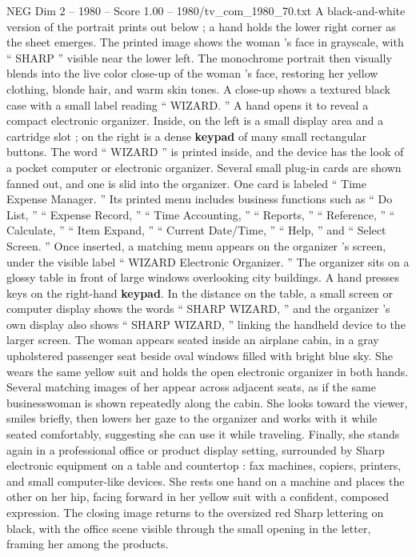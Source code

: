 \begin{textsample}{NEG Dim 2 – 1980 – Score 1.00 – 1980/tv\_com\_1980\_70.txt}
A black-and-white version of the portrait prints out below ; a hand holds the lower right corner as the sheet emerges.
The printed image shows the woman ’s face in grayscale, with “ SHARP ” visible near the lower left.
The monochrome portrait then visually blends into the live color close-up of the woman ’s face, restoring her yellow clothing, blonde hair, and warm skin tones.
A close-up shows a textured black case with a small label reading “ WIZARD. ” A hand opens it to reveal a compact electronic organizer.
Inside, on the left is a small display area and a cartridge slot ; on the right is a dense \textbf{keypad} of many small rectangular buttons.
The word “ WIZARD ” is printed inside, and the device has the look of a pocket computer or electronic organizer.
Several small plug-in cards are shown fanned out, and one is slid into the organizer.
One card is labeled “ Time Expense Manager. ” Its printed menu includes business functions such as “ Do List, ” “ Expense Record, ” “ Time Accounting, ” “ Reports, ” “ Reference, ” “ Calculate, ” “ Item Expand, ” “ Current Date/Time, ” “ Help, ” and “ Select Screen. ” Once inserted, a matching menu appears on the organizer ’s screen, under the visible label “ WIZARD Electronic Organizer. ” The organizer sits on a glossy table in front of large windows overlooking city buildings.
A hand presses keys on the right-hand \textbf{keypad}.
In the distance on the table, a small screen or computer display shows the words “ SHARP WIZARD, ” and the organizer ’s own display also shows “ SHARP WIZARD, ” linking the handheld device to the larger screen.
The woman appears seated inside an airplane cabin, in a gray upholstered passenger seat beside oval windows filled with bright blue sky.
She wears the same yellow suit and holds the open electronic organizer in both hands.
Several matching images of her appear across adjacent seats, as if the same businesswoman is shown repeatedly along the cabin.
She looks toward the viewer, smiles briefly, then lowers her gaze to the organizer and works with it while seated comfortably, suggesting she can use it while traveling.
Finally, she stands again in a professional office or product display setting, surrounded by Sharp electronic equipment on a table and countertop : fax machines, copiers, printers, and small computer-like devices.
She rests one hand on a machine and places the other on her hip, facing forward in her yellow suit with a confident, composed expression.
The closing image returns to the oversized red Sharp lettering on black, with the office scene visible through the small opening in the letter, framing her among the products.

\end{textsample}
